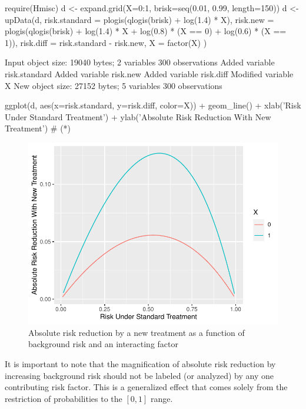 \begin{Schunk}
\begin{Sinput}
require(Hmisc)
d <- expand.grid(X=0:1, brisk=seq(0.01, 0.99, length=150))
d <- upData(d,
            risk.standard = plogis(qlogis(brisk) + log(1.4) * X),
            risk.new      = plogis(qlogis(brisk) + log(1.4) * X +
                                     log(0.8) * (X == 0) +
                                     log(0.6) * (X == 1)),
            risk.diff     = risk.standard - risk.new,
            X = factor(X) )
\end{Sinput}
\begin{Soutput}
Input object size:	 19040 bytes;	 2 variables	 300 observations
Added variable		risk.standard
Added variable		risk.new
Added variable		risk.diff
Modified variable	X
New object size:	27152 bytes;	5 variables	300 observations
\end{Soutput}
\begin{Sinput}
ggplot(d, aes(x=risk.standard, y=risk.diff, color=X)) +
  geom_line() +
  xlab('Risk Under Standard Treatment') +
  ylab('Absolute Risk Reduction With New Treatment')   # (*\ipacue*)
\end{Sinput}
\begin{figure}[htbp]

\centerline{\includegraphics[width=\maxwidth]{ancova-ordiff-1} }

\caption[Absolute risk reduction by background risk and interacting factor]{Absolute risk reduction by a new treatment as a function of background risk and an interacting factor}\label{fig:ancova-ordiff}
\end{figure}
\end{Schunk}
It is important to note that the magnification of absolute risk
reduction by increasing background risk should not be labeled (or
analyzed) by any one contributing risk factor.  This is a generalized
effect that comes solely from the restriction of probabilities to the
$[0,1]$ range.


